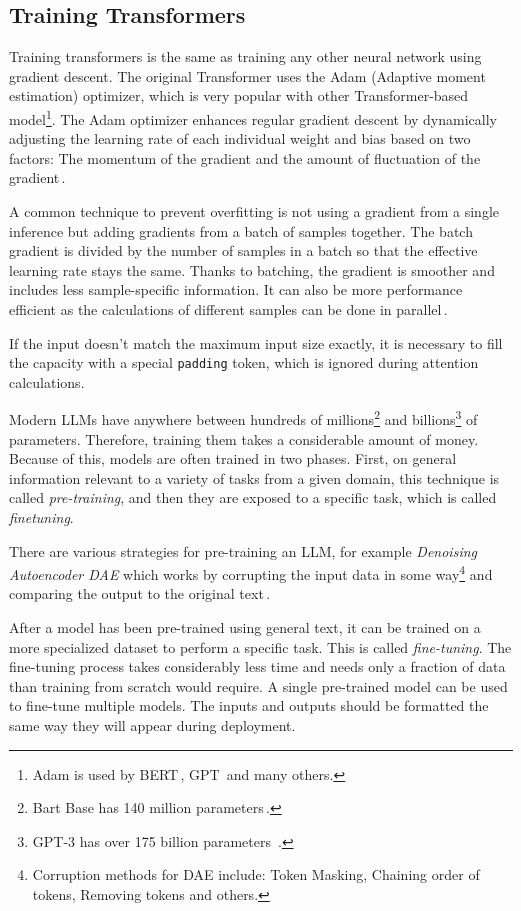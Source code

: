 \subsection{Training Transformers}
Training transformers is the same as training any other neural network using gradient descent. The original Transformer uses the Adam (Adaptive moment estimation) optimizer, which is very popular with other Transformer-based model\footnote{Adam is used by BERT\,\cite{devlin2019bert}, GPT\,\cite{gpt32020} and many others.}. The Adam optimizer enhances regular gradient descent by dynamically adjusting the learning rate of each individual weight and bias based on two factors: The momentum of the gradient and the amount of fluctuation of the gradient\,\cite{kingma2017adam}.

A common technique to prevent overfitting is not using a gradient from a single inference but adding gradients from a batch of samples together. The batch gradient is divided by the number of samples in a batch so that the effective learning rate stays the same. Thanks to batching, the gradient is smoother and includes less sample-specific information. It can also be more performance efficient as the calculations of different samples can be done in parallel\,\cite{DeepLearning2016}.

If the input doesn't match the maximum input size exactly, it is necessary to fill the capacity with a special \texttt{padding} token, which is ignored during attention calculations.

Modern LLMs have anywhere between hundreds of millions\footnote{Bart Base has 140 million parameters\,\cite{bart-2020}.} and billions\footnote{GPT-3 has over 175 billion parameters\,\cite{gpt32020} .} of parameters. Therefore, training them takes a considerable amount of money. Because of this, models are often trained in two phases. First, on general information relevant to a variety of tasks from a given domain, this technique is called \emph{pre-training}, and then they are exposed to a specific task, which is called \emph{finetuning}.

There are various strategies for pre-training an LLM, for example \emph{Denoising Autoencoder DAE} which works by corrupting the input data in some way\footnote{Corruption methods for DAE include: Token Masking, Chaining order of tokens, Removing tokens and others.} and comparing the output to the original text\,\cite{bart-2020}.

After a model has been pre-trained using general text, it can be trained on a more specialized dataset to perform a specific task. This is called \emph{fine-tuning}. The fine-tuning process takes considerably less time and needs only a fraction of data than training from scratch would require.
A single pre-trained model can be used to fine-tune multiple models.
The inputs and outputs should be formatted the same way they will appear during deployment.

